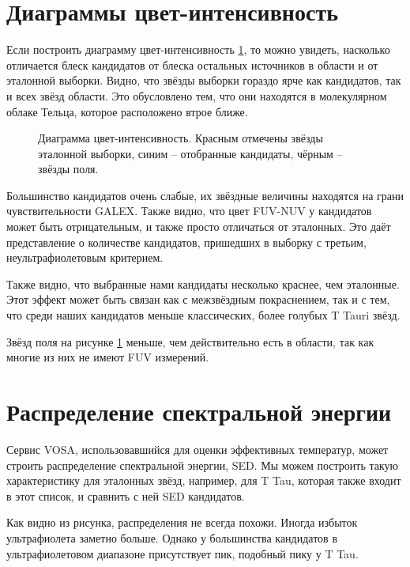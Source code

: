 

\section{Диаграммы цвет-интенсивность}

Если построить диаграмму цвет-интенсивность \ref{fig:color-magnitude}, то можно увидеть, насколько отличается блеск кандидатов от блеска остальных источников в области и от эталонной выборки. Видно, что звёзды выборки гораздо ярче как кандидатов, так и всех звёзд области. Это обусловлено тем, что они находятся в молекулярном облаке Тельца, которое расположено втрое ближе.

\begin{figure}[ht]
\hfill
\caption{Диаграмма цвет-интенсивность. Красным отмечены звёзды эталонной выборки, синим -- отобранные кандидаты, чёрным -- звёзды поля.}
\label{fig:color-magnitude}
\end{figure}

Большинство кандидатов очень слабые, их звёздные величины находятся на грани чувствительности GALEX. Также видно, что цвет FUV-NUV у кандидатов может быть отрицательным, и также просто отличаться от эталонных. Это даёт представление о количестве кандидатов, пришедших в выборку с третьим, неультрафиолетовым критерием.

Также видно, что выбранные нами кандидаты несколько краснее, чем эталонные. Этот эффект может быть связан как с межзвёздным покраснением, так и с тем, что среди наших кандидатов меньше классических, более голубых T Tauri звёзд.

Звёзд поля на рисунке \ref{fig:color-magnitude} меньше, чем действительно есть в области, так как многие из них не имеют FUV измерений.

\section{Распределение спектральной энергии}

Сервис VOSA, использовавшийся для оценки эффективных температур, может строить распределение спектральной энергии, SED. Мы можем построить такую характеристику для эталонных звёзд, например, для T Tau, которая также входит в этот список, и сравнить с ней SED кандидатов. 

Как видно из рисунка, распределения не всегда похожи. Иногда избыток ультрафиолета заметно больше. Однако у большинства кандидатов в ультрафиолетовом диапазоне присутствует пик, подобный пику у T Tau.

